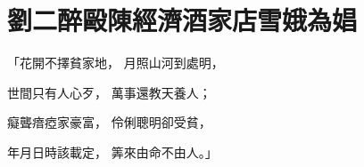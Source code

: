 %

\chapter{劉二醉毆陳經濟\KG 酒家店雪娥為娼}


\begin{showcontents}{}



「花開不擇貧家地，  月照山河到處明，

世間只有人心歹，  萬事還教天養人；

癡聾瘖瘂家豪富，  伶俐聰明卻受貧，

年月日時該載定，  筭來由命不由人。」


\end{showcontents}
